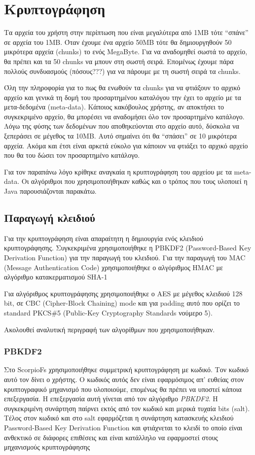 \documentclass[a4paper]{article}
\begin{document}
\section{Κρυπτογράφηση}
Τα αρχεία του χρήστη στην περίπτωση που είναι μεγαλύτερα από 1MB τότε ``σπάνε''
σε αρχεία του 1MB. Όταν έχουμε ένα αρχείο 50MB τότε θα δημιουργηθούν 50
μικρότερα αρχεία (chunks) το ενός MegaByte. Για να αναδομηθεί σωστά το αρχείο,
θα πρέπει και τα 50 chunks να μπουν στη σωστή σειρά. Επομένως έχουμε πάρα
πολλούς συνδυασμούς (πόσους???) για να πάρουμε με τη σωστή σειρά τα chunks.

Όλη την πληροφορία για το πως θα ενωθούν τα chunks για να φτιάξουν το αρχικό
αρχείο και γενικά τη δομή του προσαρτημένου καταλόγου την έχει το αρχείο με τα
μετα-δεδομένα (meta-data). Κάποιος κακόβουλος χρήστης, αν αποκτήσει το
συγκεκριμένο αρχείο, θα μπορέσει να αναδομήσει όλο τον προσαρτημένο κατάλογο.
Λόγω της φύσης των δεδομένων που αποθηκεύονται στο αρχείο αυτό, δύσκολα να
ξεπεράσει σε μέγεθος τα 10MB. Αυτό σημαίνει ότι θα ``σπάσει'' σε 10 μικρότερα
αρχεία. Ακόμα και έτσι είναι αρκετά εύκολο για κάποιον να φτιάξει το αρχικό
αρχείο που θα του δώσει τον προσαρτημένο κατάλογο.

Για τον παραπάνω λόγο κρίθηκε αναγκαία η κρυπτογράφηση του αρχείου με τα
meta-data. Οι αλγόριθμοι που χρησιμοποιήθηκαν καθώς και ο τρόπος που τους
υλοποιεί η Java παρουσιάζονται παρακάτω.

\subsection{Παραγωγή κλειδιού}
Για την κρυπτογράφηση είναι απαραίτητη η δημιουργία ενός κλειδιού
κρυπτογράφησης. Συγκεκριμένα χρησιμοποιήθηκε η PBKDF2 (Password-Based Key
Derivation Function) για την παραγωγή του κλειδιού. Για την παραγωγή του MAC
(Message Authentication Code) χρησιμοποιήθηκε ο αλγόριθμος HMAC με αλγόριθμο
κατακερματισμού SHA-1

Για αλγόριθμος κρυπτογράφησης χρησιμοποιήθηκε ο AES με μέγεθος κλειδιού 128
bit, σε CBC (Cipher-Block Chaining) mode και για padding αυτό που ορίζει το
standard PKCS\#5 (Public-Key Cryptography Standards νούμερο 5).

Ακολουθεί αναλυτική περιγραφή των αλγορίθμων που χρησιμοποιήθηκαν.

\subsubsection{PBKDF2}
Στο ScorpioFs χρησιμοποιήθηκε συμμετρική κρυπτογράφηση με κωδικό. Τον κωδικό
αυτό τον δίνει ο χρήστης. Ο κωδικός αυτός δεν είναι εφαρμόσιμος απ' ευθείας στον
κρυπτογραφικό μηχανισμό που υλοποιούμε, επομένως θα πρέπει να υποστεί κάποια
επεξεργασία. Η επεξεργασία αυτή γίνεται από τον αλγόριθμο \emph{PBKDF2}. Η
συγκεκριμένη συνάρτηση παίρνει εκτός από τον κωδικό και μερικά τυχαία bits
(salt). Τέλος στον κωδικό και στο salt εφαρμόζεται η συνάρτηση κατασκευής
κλειδιού Password-Based Key Derivation Function και φτιάχνεται το κλειδί το
οποίο είναι ανθεκτικό σε διάφορες επιθέσεις και είναι κατάλληλο να εφαρμοστεί
στους μηχανισμούς κρυπτογράφησης
\end{document}
